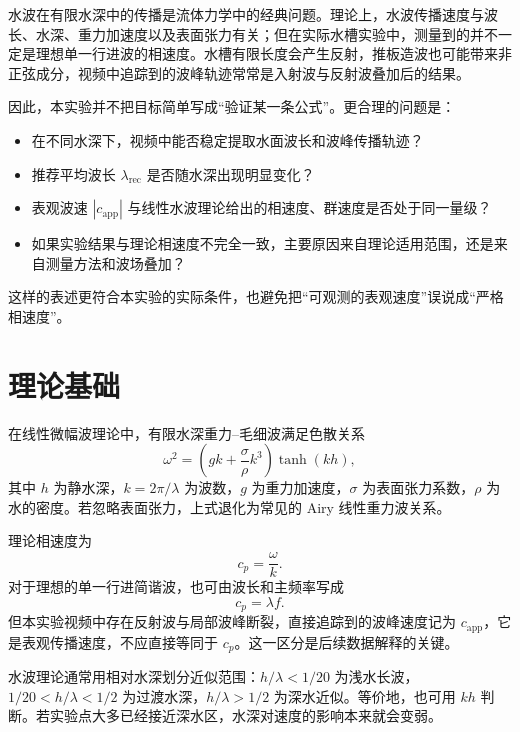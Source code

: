 \documentclass[UTF8,a4paper,11pt]{ctexart}
\begin{document}
水波在有限水深中的传播是流体力学中的经典问题。理论上，水波传播速度与波长、水深、重力加速度以及表面张力有关；但在实际水槽实验中，测量到的并不一定是理想单一行进波的相速度。水槽有限长度会产生反射，推板造波也可能带来非正弦成分，视频中追踪到的波峰轨迹常常是入射波与反射波叠加后的结果。

因此，本实验并不把目标简单写成“验证某一条公式”。更合理的问题是：

\begin{itemize}
  \item 在不同水深下，视频中能否稳定提取水面波长和波峰传播轨迹？
  \item 推荐平均波长 $\lambda_{\mathrm{rec}}$ 是否随水深出现明显变化？
  \item 表观波速 $|c_{\mathrm{app}}|$ 与线性水波理论给出的相速度、群速度是否处于同一量级？
  \item 如果实验结果与理论相速度不完全一致，主要原因来自理论适用范围，还是来自测量方法和波场叠加？
\end{itemize}

这样的表述更符合本实验的实际条件，也避免把“可观测的表观速度”误说成“严格相速度”。

\section{理论基础}

在线性微幅波理论中，有限水深重力--毛细波满足色散关系
\begin{equation}
  \omega^2=\left(gk+\frac{\sigma}{\rho}k^3\right)\tanh(kh),
\end{equation}
其中 $h$ 为静水深，$k=2\pi/\lambda$ 为波数，$g$ 为重力加速度，$\sigma$ 为表面张力系数，$\rho$ 为水的密度。若忽略表面张力，上式退化为常见的 Airy 线性重力波关系。

理论相速度为
\begin{equation}
  c_p=\frac{\omega}{k}.
\end{equation}
对于理想的单一行进简谐波，也可由波长和主频率写成
\begin{equation}
  c_p=\lambda f.
\end{equation}
但本实验视频中存在反射波与局部波峰断裂，直接追踪到的波峰速度记为 $c_{\mathrm{app}}$，它是表观传播速度，不应直接等同于 $c_p$。这一区分是后续数据解释的关键。

水波理论通常用相对水深划分近似范围：$h/\lambda<1/20$ 为浅水长波，$1/20<h/\lambda<1/2$ 为过渡水深，$h/\lambda>1/2$ 为深水近似。等价地，也可用 $kh$ 判断。若实验点大多已经接近深水区，水深对速度的影响本来就会变弱。
\end{document}
